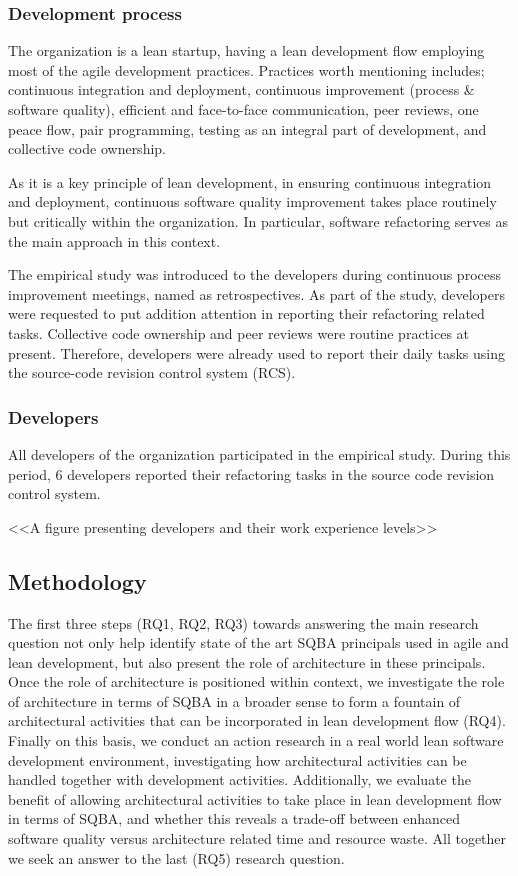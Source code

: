 \documentclass[english,12pt,a4paper,pdftex,sci,utf8]{aaltothesis}
\begin{document}
\subsubsection*{Development process} \label{process}
The organization is a lean startup, having a lean development flow employing most of the agile development practices. Practices worth mentioning includes; continuous integration and deployment, continuous improvement (process & software quality), efficient and face-to-face communication, peer reviews, one peace flow, pair programming, testing as an integral part of development, and collective code ownership.

As it is a key principle of lean development, in ensuring continuous integration and deployment, continuous software quality improvement takes place routinely but critically within the organization. In particular, software refactoring serves as the main approach in this context.  

The empirical study was introduced to the developers during continuous process improvement meetings, named as retrospectives. As part of the study, developers were requested to put addition attention in reporting their refactoring related tasks. Collective code ownership and peer reviews were routine practices at present. Therefore, developers were already used to report their daily tasks using the source-code revision control system (RCS). 

\subsubsection*{Developers} \label{developers}
All developers of the organization participated in the empirical study. During this period, 6 developers reported their refactoring tasks in the source code revision control system.

<<A figure presenting developers and their work experience levels>>

\subsection{Methodology} \label{methodology}
The first three steps (RQ1, RQ2, RQ3) towards answering the main research question not only help identify state of the art SQBA principals used in agile and lean development, but also present the role of architecture in these principals. Once the role of architecture is positioned within context, we investigate the role of architecture in terms of SQBA in a broader sense to form a fountain of architectural activities that can be incorporated in lean development flow (RQ4). Finally on this basis, we conduct an action research in a real world lean software development environment, investigating how architectural activities can be handled together with development activities. Additionally, we evaluate the benefit of allowing architectural activities to take place in lean development flow in terms of SQBA, and whether this reveals a trade-off between enhanced software quality versus architecture related time and resource waste. All together we seek an answer to the last (RQ5) research question. 
\end{document}
